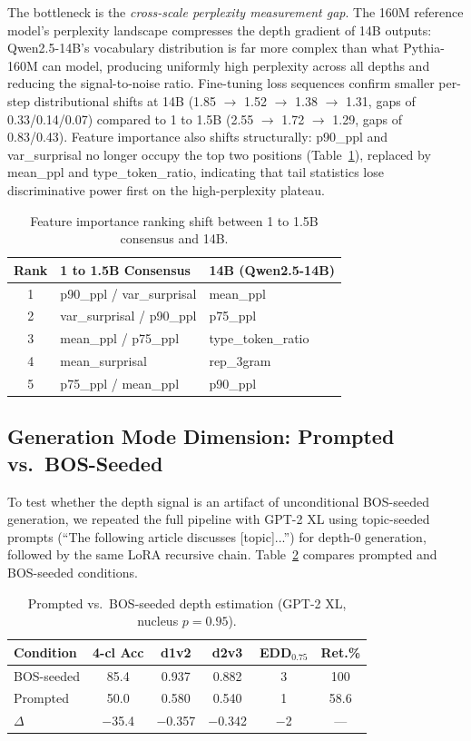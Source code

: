 \documentclass[11pt,a4paper]{article}
\begin{document}
The bottleneck is the \emph{cross-scale perplexity measurement gap}.
The 160M reference model's perplexity landscape compresses the depth gradient of 14B outputs: Qwen2.5-14B's vocabulary distribution is far more complex than what Pythia-160M can model, producing uniformly high perplexity across all depths and reducing the signal-to-noise ratio.
Fine-tuning loss sequences confirm smaller per-step distributional shifts at 14B (1.85 $\to$ 1.52 $\to$ 1.38 $\to$ 1.31, gaps of 0.33/0.14/0.07) compared to 1 to 1.5B (2.55 $\to$ 1.72 $\to$ 1.29, gaps of 0.83/0.43).
Feature importance also shifts structurally: p90\_ppl and var\_surprisal no longer occupy the top two positions (Table~\ref{tab:feature_shift}), replaced by mean\_ppl and type\_token\_ratio, indicating that tail statistics lose discriminative power first on the high-perplexity plateau.

\begin{table}[t]
\centering
\caption{Feature importance ranking shift between 1 to 1.5B consensus and 14B.}
\label{tab:feature_shift}
\small
\begin{tabular}{cll}
\toprule
Rank & 1 to 1.5B Consensus & 14B (Qwen2.5-14B) \\
\midrule
1 & p90\_ppl / var\_surprisal & mean\_ppl \\
2 & var\_surprisal / p90\_ppl & p75\_ppl \\
3 & mean\_ppl / p75\_ppl & type\_token\_ratio \\
4 & mean\_surprisal & rep\_3gram \\
5 & p75\_ppl / mean\_ppl & p90\_ppl \\
\bottomrule
\end{tabular}
\end{table}

\subsection{Generation Mode Dimension: Prompted vs.\ BOS-Seeded}
\label{sec:prompted}

To test whether the depth signal is an artifact of unconditional BOS-seeded generation, we repeated the full pipeline with GPT-2 XL using topic-seeded prompts (``The following article discusses [topic]...'') for depth-0 generation, followed by the same LoRA recursive chain.
Table~\ref{tab:prompted} compares prompted and BOS-seeded conditions.

\begin{table}[t]
\centering
\caption{Prompted vs.\ BOS-seeded depth estimation (GPT-2 XL, nucleus $p{=}0.95$).}
\label{tab:prompted}
\small
\begin{tabular}{lccccc}
\toprule
Condition & 4-cl Acc & d1v2 & d2v3 & EDD$_{0.75}$ & Ret.\% \\
\midrule
BOS-seeded & 85.4 & 0.937 & 0.882 & 3 & 100 \\
Prompted   & 50.0 & 0.580 & 0.540 & 1 & 58.6 \\
\midrule
$\Delta$   & $-$35.4 & $-$0.357 & $-$0.342 & $-$2 & --- \\
\bottomrule
\end{tabular}
\end{table}
\end{document}
